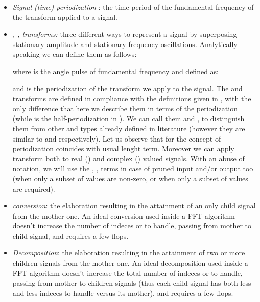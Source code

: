 \documentclass[a4paper,10pt]{article}
\begin{document}
\begin{itemize}






\item 
\emph{Signal (time) periodization }:
the time period of the fundamental frequency of the transform applied to a signal.








\item
\emph{, ,  transforms:}
three different ways to represent a signal by superposing stationary-amplitude and stationary-frequency oscillations. 
Analytically speaking we can define them as follows:



where  is the angle pulse of fundamental frequency and defined as:

and  is the periodization of the transform we apply to the signal.
The  and  transforms are defined in compliance with the definitions given in \cite{Guo_Sitton_qft_1994}, with the only difference that here we describe them in terms of the periodization   (while  is the half-periodization in \cite{Guo_Sitton_qft_1994}).
We can call them  and , to distinguish them from other  and  types already defined in literature (however they are similar to  and  respectively).
Let us observe that for  the concept of periodization coincides with usual lenght term.
Moreover we can apply  transform both to real () and complex () valued signals.
With an abuse of notation, we will use the , ,  terms in case of pruned input and/or output too (when only a subset of  values  are non-zero, or when only a subset of  values  are required).




\item
\emph{conversion}: the elaboration resulting in the attainment of an only child signal from the mother one.
An ideal conversion used inside a FFT algorithm doesn't increase the number of indeces  or  to handle, passing from mother to child signal, and requires a few flops.


\item
\emph{Decomposition}:
the elaboration resulting in the attainment of two or more children signals from the mother one.
An ideal decomposition used inside a FFT algorithm doesn't increase the total number of indeces  or  to handle, passing from mother to children signals (thus each child signal has both less  and less  indeces to handle versus its mother), and requires a few flops.



\end{itemize}
\end{document}
